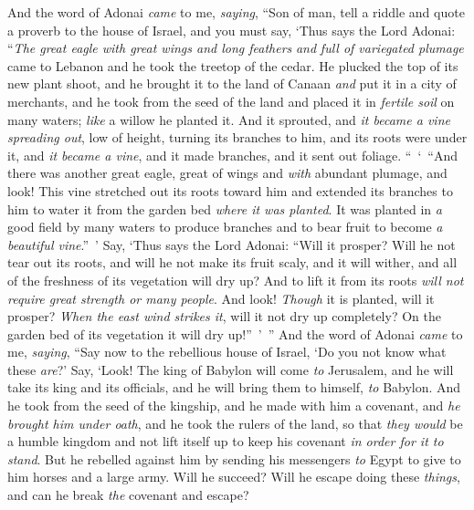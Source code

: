 \begin{biblechapter} %
 And the word of Adonai \textit{came} to me, \textit{saying},
\verse “Son of man, tell a riddle and quote a proverb to the house of Israel,
\verse and you must say, ‘Thus says the Lord Adonai: “\textit{The great eagle with great wings and long feathers} \textit{and} \textit{full of variegated plumage} came to Lebanon and he took the treetop of the cedar.
\verse He plucked the top of its new plant shoot, and he brought it to the land of Canaan \textit{and} put it in a city of merchants,
\verse and he took from the seed of the land and placed it in \textit{fertile soil} on many waters; \textit{like} a willow he planted it.
\verse And it sprouted, and \textit{it became a vine spreading out}, low of height, turning its branches to him, and its roots were under it, and \textit{it became a vine}, and it made branches, and it sent out foliage.
\verse “ ‘ “And there was another great eagle, great of wings and \textit{with} abundant plumage, and look! This vine stretched out its roots toward him and extended its branches to him to water it from the garden bed \textit{where it was planted}.
\verse It was planted in \textit{a} good field by many waters to produce branches and to bear fruit to become \textit{a beautiful vine}.” ’
\verse Say, ‘Thus says the Lord Adonai: “Will it prosper? Will he not tear out its roots, and will he not make its fruit scaly, and it will wither, and all of the freshness of its vegetation will dry up? And to lift it from its roots \textit{will not require great strength or many people}.
\verse And look! \textit{Though} it is planted, will it prosper? \textit{When the east wind strikes it}, will it not dry up completely? On the garden bed of its vegetation it will dry up!” ’ ”
\verse And the word of Adonai \textit{came} to me, \textit{saying},
\verse “Say now to the rebellious house of Israel, ‘Do you not know what these \textit{are}?’ Say, ‘Look! The king of Babylon will come \textit{to} Jerusalem, and he will take its king and its officials, and he will bring them to himself, \textit{to} Babylon.
\verse And he took from the seed of the kingship, and he made with him a covenant, and \textit{he brought him under oath}, and he took the rulers of the land,
\verse so that \textit{they would} be a humble kingdom and not lift itself up to keep his covenant \textit{in order for it to stand}.
\verse But he rebelled against him by sending his messengers \textit{to} Egypt to give to him horses and a large army. Will he succeed? Will he escape doing these \textit{things}, and can he break \textit{the} covenant and escape?

\end{biblechapter}
